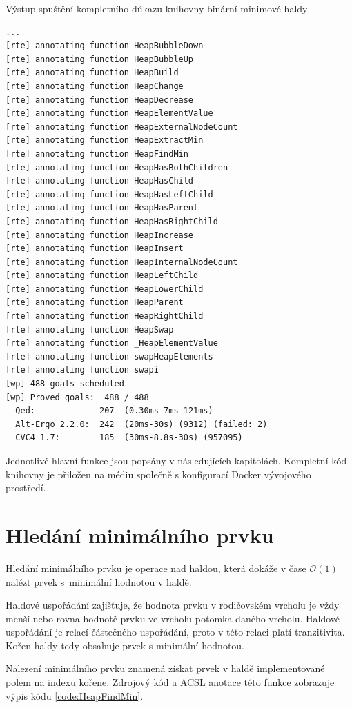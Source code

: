 \begin{listing}[H]
	\caption{Výstup spuštění kompletního důkazu knihovny binární minimové haldy}
	\label{shell:run-frama-c-proofs-output}
	\begin{verbatim}
...
[rte] annotating function HeapBubbleDown
[rte] annotating function HeapBubbleUp
[rte] annotating function HeapBuild
[rte] annotating function HeapChange
[rte] annotating function HeapDecrease
[rte] annotating function HeapElementValue
[rte] annotating function HeapExternalNodeCount
[rte] annotating function HeapExtractMin
[rte] annotating function HeapFindMin
[rte] annotating function HeapHasBothChildren
[rte] annotating function HeapHasChild
[rte] annotating function HeapHasLeftChild
[rte] annotating function HeapHasParent
[rte] annotating function HeapHasRightChild
[rte] annotating function HeapIncrease
[rte] annotating function HeapInsert
[rte] annotating function HeapInternalNodeCount
[rte] annotating function HeapLeftChild
[rte] annotating function HeapLowerChild
[rte] annotating function HeapParent
[rte] annotating function HeapRightChild
[rte] annotating function HeapSwap
[rte] annotating function _HeapElementValue
[rte] annotating function swapHeapElements
[rte] annotating function swapi
[wp] 488 goals scheduled
[wp] Proved goals:  488 / 488
  Qed:             207  (0.30ms-7ms-121ms)
  Alt-Ergo 2.2.0:  242  (20ms-30s) (9312) (failed: 2)
  CVC4 1.7:        185  (30ms-8.8s-30s) (957095)
	\end{verbatim}
\end{listing}

Jednotlivé hlavní funkce jsou popsány v následujících kapitolách. Kompletní kód knihovny je přiložen na médiu společně s konfigurací Docker vývojového prostředí.

\section{Hledání minimálního prvku}
\label{subsec:HeapFindMin}

Hledání minimálního prvku je operace nad haldou, která dokáže v čase $\mathcal{O}(1)$ nalézt prvek s~minimální hodnotou v haldě.

Haldové uspořádání zajišťuje, že hodnota prvku v rodičovském vrcholu je vždy menší nebo rovna hodnotě prvku ve vrcholu potomka daného vrcholu. Haldové uspořádání je relací částečného uspořádání, proto v této relaci platí tranzitivita. Kořen haldy tedy obsahuje prvek s minimální hodnotou.

Nalezení minimálního prvku znamená získat prvek v haldě implementované polem na indexu kořene. Zdrojový kód a ACSL anotace této funkce zobrazuje výpis kódu \ref{code:HeapFindMin}.


